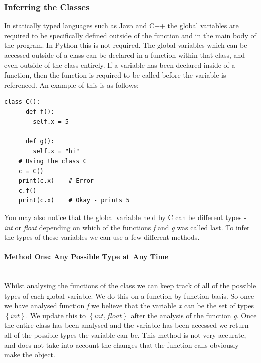 \documentclass[12pt, titlepage]{article}
\begin{document}
\subsubsection{Inferring the Classes}
In statically typed languages such as Java and C++ the global variables are required to be specifically defined outside of the function and in the main body of the program. In Python this is not required. The global variables which can be accessed outside of a class can be declared in a function within that class, and even outside of the class entirely. If a variable has been declared inside of a function, then the function is required to be called before the variable is referenced. An example of this is as follows:
\begin{lstlisting}[mathescape]
	class C():
	  def f():
	    self.x = 5
		
	  def g():
	    self.x = "hi"
	# Using the class C
	c = C()
	print(c.x)    # Error
	c.f()
	print(c.x)    # Okay - prints 5
\end{lstlisting}
You may also notice that the global variable held by C can be different types - \textit{int} or \textit{float} depending on which of the functions \textit{f} and \textit{g} was called last. To infer the types of these variables we can use a few different methods.

\paragraph{Method One: Any Possible Type at Any Time}\mbox{}\\
Whilst analysing the functions of the class we can keep track of all of the possible types of each global variable. We do this on a function-by-function basis. So once we have analysed function \textit{f} we believe that the variable \textit{x} can be the set of types $\left\{ {int}\right\}$. We update this to $\left\{ {int, float}\right\}$ after the analysis of the function \textit{g}. Once the entire class has been analysed and the variable has been accessed we return all of the possible types the variable can be. This method is not very accurate, and does not take into account the changes that the function calls obviously make the object.
\end{document}
